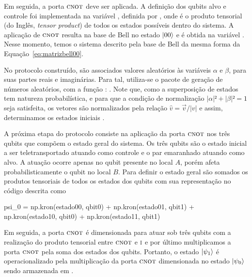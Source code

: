 Em seguida, a porta \(\operatorname{\textsc{cnot}}\) deve ser aplicada. A definição dos qubits alvo e controle foi implementada na variável , definida por , onde  é o produto tensorial (do Inglês, \textit{tensor product}) de todos os estados possíveis dentro do sistema. A aplicação de \(\operatorname{\textsc{cnot}}\) resulta na base de Bell no estado $\ket{00}$ e é obtida na variável . Nesse momento, temos o sistema descrito pela base de Bell da mesma forma da Equação~\eqref{eq:matrizbell00}.

No protocolo construído, são associados valores aleatórios às variáveis $\alpha$ e $\beta$, para suas partes reais e imaginárias. Para tal, utiliza-se o pacote  de geração de números aleatórios, com a função : . Note que, como a superposição de estados tem natureza probabilística, e para que a condição de normalização $\lvert\alpha\rvert² + \lvert\beta\rvert² = 1$ seja satisfeita, os vetores são normalizados pela relação $\widehat{v} = \vec{v}/\lvert v\rvert$ e assim, determinamos os estados iniciais .

A próxima etapa do protocolo consiste na aplicação da porta \(\operatorname{\textsc{cnot}}\) nos três qubits que compõem o estado geral do sistema. Os três qubits são o estado inicial a ser teletransportado atuando como controle e o par emaranhado atuando como alvo. A atuação ocorre apenas no qubit presente no local \(A\), porém afeta probabilisticamente o qubit no local \(B\). Para definir o estado geral são somados os produtos tensoriais de todos os estados dos qubits com sua representação no código descrita como
\begin{pycode}
  psi_0 = np.kron(estado00, qbit0) + np.kron(estado01, qbit1)
        + np.kron(estado10, qbit0) + np.kron(estado11, qbit1)
\end{pycode}
Em seguida, a porta \(\operatorname{\textsc{cnot}}\) é dimensionada para atuar sob três qubits com a realização do produto tensorial entre \(\operatorname{\textsc{cnot}}\) e \(\operatorname{\textsc{i}}\) e por último multiplicamos a porta \(\operatorname{\textsc{cnot}}\) pela soma dos estados dos qubits. Portanto, o estado $\ket{\psi_1}$ é operacionalizado pela multiplicação da porta \(\operatorname{\textsc{cnot}}\) dimensionada no estado $\ket{\psi_0}$ sendo armazenada em .

